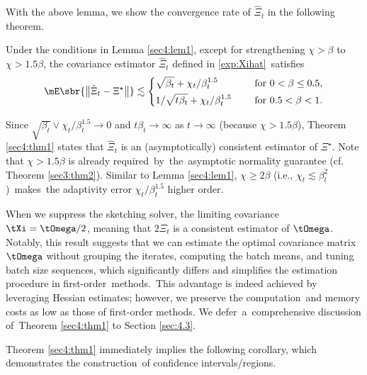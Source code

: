 With the above lemma, we show the convergence rate of $\hat{\Xi}_t$ in the following theorem.


\begin{theorem}\label{sec4:thm1}
Under the conditions in Lemma \ref{sec4:lem1}, except for strengthening $\chi>\beta$ to $\chi>1.5\beta$, the covariance estimator $\hat{\Xi}_t$ defined in \eqref{exp:Xihat}~satisfies
\begin{equation*}
\mE\sbr{\big\|\hat{\Xi}_t-\Xi^\star\big\|}\lesssim \left\{\begin{aligned} &\sqrt{\beta_t} + \chi_t/\beta_t^{1.5}\quad &\text{ for } 0<\beta\leq 0.5,\\
&1/\sqrt{t\beta_t} + \chi_t/\beta_t^{1.5}\quad &\text{ for } 0.5<\beta<1.
\end{aligned}\right.
\end{equation*}
\end{theorem}


Since $\sqrt{\beta_t} \vee \chi_t/\beta_t^{1.5}\rightarrow 0$ and $t\beta_t\rightarrow \infty$ as $t\rightarrow\infty$ (because $\chi>1.5\beta$), Theorem \ref{sec4:thm1} states that $\hat{\Xi}_t$ is an (asymptotically) consistent estimator of $\Xi^{\star}$. Note that $\chi>1.5\beta$ is already \mbox{required}~by~the~asymptotic normality guarantee (cf. Theorem \ref{sec3:thm2}). Similar to Lemma \ref{sec4:lem1}, $\chi\geq2\beta$ (i.e., $\chi_t\lesssim \beta_t^2$)~makes~the adaptivity error $\chi_t/\beta_t^{1.5}$ higher order.


When we suppress the sketching solver, the limiting covariance $\tXi = \tOmega/2$, meaning that $2\hat{\Xi}_t$ is a consistent estimator of $\tOmega$. Notably, this result suggests that we can estimate the optimal covariance matrix $\tOmega$ without grouping the iterates, computing the batch means, and tuning batch size sequences, which significantly differs and simplifies the estimation procedure in first-order~\mbox{methods}.~This advantage is indeed achieved by leveraging Hessian estimates; however, we preserve the computation~and memory costs as low as those of first-order methods. We defer~a~comprehensive discussion of~Theorem \ref{sec4:thm1} to Section \ref{sec:4.3}.


Theorem \ref{sec4:thm1} immediately implies the following corollary, which demonstrates the construction~of confidence intervals/regions. 


